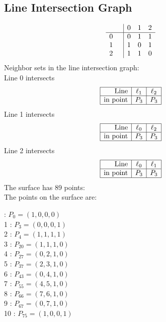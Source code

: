 \documentclass{article}
\begin{document}
{\subsection*{Line Intersection Graph}
{\arraycolsep=1pt
$$
\begin{array}{rr|*{3}r}
 &  & 0 & 1 & 2\\
\hline
0 &  & 0 & 1 & 1\\
1 &  & 1 & 0 & 1\\
2 &  & 1 & 1 & 0\\
\end{array}
$$
}%
Neighbor sets in the line intersection graph:\\
Line 0 intersects 
$$
\begin{array}{|r*{2}{|c}|}
\hline
\mbox{Line}  & \ell_{1} & \ell_{2}\\
\hline
\mbox{in point}  & P_{3} & P_{3}\\
\hline
\end{array}
$$
Line 1 intersects 
$$
\begin{array}{|r*{2}{|c}|}
\hline
\mbox{Line}  & \ell_{0} & \ell_{2}\\
\hline
\mbox{in point}  & P_{3} & P_{3}\\
\hline
\end{array}
$$
Line 2 intersects 
$$
\begin{array}{|r*{2}{|c}|}
\hline
\mbox{Line}  & \ell_{0} & \ell_{1}\\
\hline
\mbox{in point}  & P_{3} & P_{3}\\
\hline
\end{array}
$$
The surface has 89 points:\\
The points on the surface are:\\
\begin{multicols}{3}
 : $P_{0}=( 1, 0, 0, 0 )$\\
1 : $P_{3}=( 0, 0, 0, 1 )$\\
2 : $P_{4}=( 1, 1, 1, 1 )$\\
3 : $P_{20}=( 1, 1, 1, 0 )$\\
4 : $P_{27}=( 0, 2, 1, 0 )$\\
5 : $P_{37}=( 2, 3, 1, 0 )$\\
6 : $P_{43}=( 0, 4, 1, 0 )$\\
7 : $P_{55}=( 4, 5, 1, 0 )$\\
8 : $P_{66}=( 7, 6, 1, 0 )$\\
9 : $P_{67}=( 0, 7, 1, 0 )$\\
10 : $P_{75}=( 1, 0, 0, 1 )$\\

\end{multicols}}
\end{document}
